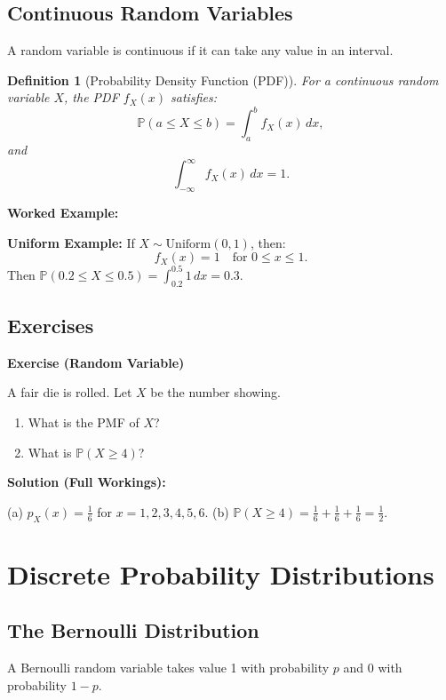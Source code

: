 \documentclass[12pt,a4paper,oneside]{report}
\theoremstyle{mytheorem}
\theoremstyle{mydefinition}
\newtheorem{definition}[theorem]{Definition}
\theoremstyle{myremark}
\newenvironment{exercise}[1]{%
  \par\medskip\noindent\textbf{\color{myblue}Exercise (#1)}\par\smallskip
}{%
  \par\smallskip
}
\newenvironment{solution}{%
  \par\noindent\textbf{\color{mygreen}Solution (Full Workings):}\par\smallskip
}{%
  \par\bigskip
}
\newenvironment{worked}{%
  \par\medskip\noindent\textbf{\color{myorange}Worked Example:}\par\smallskip
}{%
  \par\medskip
}
\newcommand{\Prob}{\mathbb{P}}
\begin{document}
\section{Continuous Random Variables}
A random variable is continuous if it can take any value in an interval.

\begin{definition}[Probability Density Function (PDF)]
For a continuous random variable $X$, the PDF $f_X(x)$ satisfies:
\[
\Prob(a \le X \le b) = \int_a^b f_X(x)\,dx,
\]
and
\[
\int_{-\infty}^{\infty} f_X(x)\,dx = 1.
\]
\end{definition}

\begin{worked}
\textbf{Uniform Example:}
If $X \sim \text{Uniform}(0,1)$, then:
\[
f_X(x) = 1 \quad \text{for } 0 \le x \le 1.
\]
Then $\Prob(0.2 \le X \le 0.5) = \int_{0.2}^{0.5} 1\,dx = 0.3$.
\end{worked}

\section{Exercises}
\begin{exercise}{Random Variable}
A fair die is rolled. Let $X$ be the number showing.
\begin{enumerate}[label=(\alph*)]
    \item What is the PMF of $X$?
    \item What is $\Prob(X \ge 4)$?
\end{enumerate}
\end{exercise}
\begin{solution}
(a) $p_X(x) = \frac{1}{6}$ for $x = 1,2,3,4,5,6$.
(b) $\Prob(X \ge 4) = \frac{1}{6} + \frac{1}{6} + \frac{1}{6} = \frac{1}{2}$.
\end{solution}

\chapter{Discrete Probability Distributions}

\section{The Bernoulli Distribution}
A Bernoulli random variable takes value 1 with probability $p$ and 0 with probability $1-p$.
\end{document}
